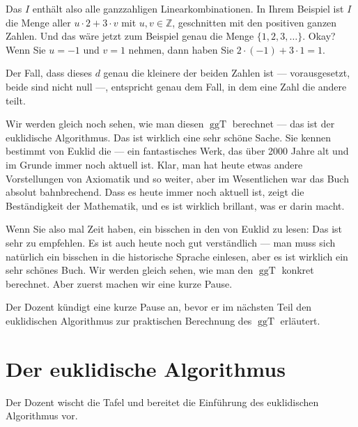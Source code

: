 \begin{spoken-clean}[00:26:41 - 00:28:29]
Das $I$ enthält also alle ganzzahligen Linearkombinationen. In Ihrem Beispiel ist $I$ die Menge aller $u \cdot 2 + 3 \cdot v$ mit $u, v \in \mathbb{Z}$, geschnitten mit den positiven ganzen Zahlen. Und das wäre jetzt zum Beispiel genau die Menge $\{1, 2, 3, \dots\}$. Okay? Wenn Sie $u = -1$ und $v = 1$ nehmen, dann haben Sie $2 \cdot (-1) + 3 \cdot 1 = 1$.

Der Fall, dass dieses $d$ genau die kleinere der beiden Zahlen ist --- vorausgesetzt, beide sind nicht null ---, entspricht genau dem Fall, in dem eine Zahl die andere teilt.

Wir werden gleich noch sehen, wie man diesen $\operatorname{ggT}$ berechnet --- das ist der euklidische Algorithmus. Das ist wirklich eine sehr schöne Sache. Sie kennen bestimmt von Euklid die  --- ein fantastisches Werk, das über 2000 Jahre alt und im Grunde immer noch aktuell ist. Klar, man hat heute etwas andere Vorstellungen von Axiomatik und so weiter, aber im Wesentlichen war das Buch absolut bahnbrechend. Dass es heute immer noch aktuell ist, zeigt die Beständigkeit der Mathematik, und es ist wirklich brillant, was er darin macht.

Wenn Sie also mal Zeit haben, ein bisschen in den  von Euklid zu lesen: Das ist sehr zu empfehlen. Es ist auch heute noch gut verständlich --- man muss sich natürlich ein bisschen in die historische Sprache einlesen, aber es ist wirklich ein sehr schönes Buch. Wir werden gleich sehen, wie man den $\operatorname{ggT}$ konkret berechnet. Aber zuerst machen wir eine kurze Pause.
\end{spoken-clean}

\begin{meta-note}[Vorlesungspause]
Der Dozent kündigt eine kurze Pause an, bevor er im nächsten Teil den euklidischen Algorithmus zur praktischen Berechnung des $\operatorname{ggT}$ erläutert.
\end{meta-note}

\section{Der euklidische Algorithmus}

\begin{meta-note}[Tafelübergang]
Der Dozent wischt die Tafel und bereitet die Einführung des euklidischen Algorithmus vor.
\end{meta-note}

